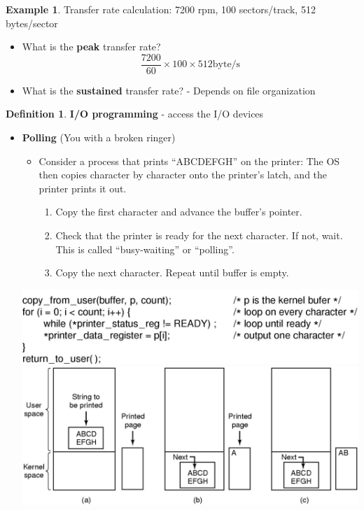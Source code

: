 \documentclass[11pt,a4paper]{article}
\theoremstyle{definition}
\newtheorem{definition}{Definition}[section]
\newtheorem{example}{Example}[section]
\newenvironment{myitemize}
{ \begin{itemize}
    \setlength{\itemsep}{5pt}
    \setlength{\parskip}{0pt}
    \setlength{\parsep}{0pt}     }
{ \end{itemize}                  }
\newenvironment{myenumerate}
{ \begin{enumerate}
    \setlength{\itemsep}{5pt}
    \setlength{\parskip}{0pt}
    \setlength{\parsep}{0pt}     }
{ \end{enumerate}                }
\begin{document}
\begin{example}{Transfer rate calculation:}
	7200 rpm, 100 sectors/track, 512 bytes/sector
	\begin{myitemize}
		\item What is the \textbf{peak} transfer rate?
		\[\frac{7200}{60} \times 100 \times 512 \text{byte/s} \]
		\item What is the \textbf{sustained} transfer rate? - Depends on file organization
	\end{myitemize}
\end{example}

\begin{definition}{\textbf{I/O programming} - access the I/O devices}
	\begin{myitemize}
		\item \textbf{Polling} (You with a broken ringer)
		
		\begin{minipage}{0.48\linewidth}
			\begin{myitemize}
			\item Consider a process that prints “ABCDEFGH” on the printer: The OS then copies character by character onto the printer’s latch, and the printer prints it out.
			\begin{myenumerate}
				\item Copy the first character and advance the buffer’s pointer. 
				\item Check that the printer is ready for the next character. If not, wait. This is called ``busy-waiting'' or ``polling''.
				\item Copy the next character. Repeat until buffer is empty.
			\end{myenumerate}
		\end{myitemize}
		\end{minipage}\hspace{2mm}
		\begin{minipage}{0.48\linewidth}
				\includegraphics[width=\linewidth]{m3/polling}
				\includegraphics[width=\linewidth]{m3/polling1}
		\end{minipage}
		

\end{myitemize}
\end{definition}
\end{document}
